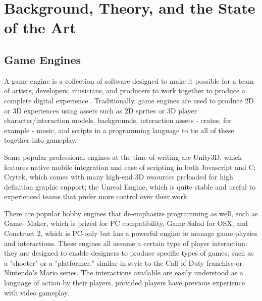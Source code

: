 \chapter{Background, Theory, and the State of the Art}\thispagestyle{empty} %

\label{Chapter2} %


\section{Game Engines}
A game engine is a collection of software designed to make it possible for a team of artists, developers, musicians, and producers to work together to produce a complete digital experience.. Traditionally, game engines are used to produce 2D or 3D experiences using assets such as 2D sprites or 3D player character/interaction models, backgrounds, interaction assets - crates, for example - music, and scripts in a programming language to tie all of these together into gameplay. 

Some popular professional engines at the time of writing are Unity3D, which features native mobile integration and ease of scripting in both Javascript and C; Crytek, which comes with many high-end 3D resources preloaded for high definition graphic support; the Unreal Engine, which is quite stable and useful to experienced teams that prefer more control over their work.

There are popular hobby engines that de-emphasize programming as well, such as Game- Maker, which is prized for PC compatibility, Game Salad for OSX, and Construct 2, which is PC-only but has a powerful engine to manage game physics and interactions. These engines all assume a certain type of player interaction: they are designed to enable designers to produce specific types of games, such as a "shooter" or a "platformer," similar in style to the Call of Duty franchise or Nintendo's Mario series. The interactions available are easily understood as a language of action by their players, provided players have previous experience with video gameplay.

